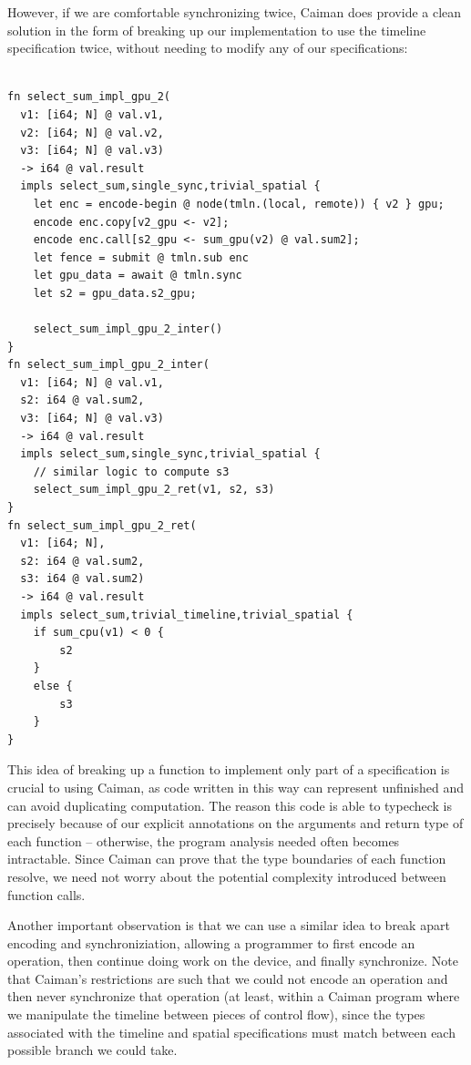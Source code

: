 However, if we are comfortable synchronizing twice, Caiman does provide a clean solution in the form of breaking up our implementation to use the timeline specification twice, without needing to modify any of our specifications:
%
\begin{lstlisting}

fn select_sum_impl_gpu_2(
  v1: [i64; N] @ val.v1,
  v2: [i64; N] @ val.v2,
  v3: [i64; N] @ val.v3) 
  -> i64 @ val.result
  impls select_sum,single_sync,trivial_spatial {
    let enc = encode-begin @ node(tmln.(local, remote)) { v2 } gpu;
    encode enc.copy[v2_gpu <- v2];
    encode enc.call[s2_gpu <- sum_gpu(v2) @ val.sum2];
    let fence = submit @ tmln.sub enc
    let gpu_data = await @ tmln.sync
    let s2 = gpu_data.s2_gpu;
    
    select_sum_impl_gpu_2_inter()
}
fn select_sum_impl_gpu_2_inter(
  v1: [i64; N] @ val.v1, 
  s2: i64 @ val.sum2, 
  v3: [i64; N] @ val.v3)
  -> i64 @ val.result
  impls select_sum,single_sync,trivial_spatial {
    // similar logic to compute s3
    select_sum_impl_gpu_2_ret(v1, s2, s3)
}
fn select_sum_impl_gpu_2_ret(
  v1: [i64; N], 
  s2: i64 @ val.sum2, 
  s3: i64 @ val.sum2) 
  -> i64 @ val.result
  impls select_sum,trivial_timeline,trivial_spatial {
    if sum_cpu(v1) < 0 {
        s2
    }
    else {
        s3
    }
}
\end{lstlisting}
%
This idea of breaking up a function to implement only part of a specification is crucial to using Caiman, as code written in this way can represent unfinished and can avoid duplicating computation.  The reason this code is able to typecheck is precisely because of our explicit annotations on the arguments and return type of each function -- otherwise, the program analysis needed often becomes intractable.  Since Caiman can prove that the type boundaries of each function resolve, we need not worry about the potential complexity introduced between function calls.

Another important observation is that we can use a similar idea to break apart encoding and synchroniziation, allowing a programmer to first encode an operation, then continue doing work on the device, and finally synchronize.  Note that Caiman's restrictions are such that we could not encode an operation and then never synchronize that operation (at least, within a Caiman program where we manipulate the timeline between pieces of control flow), since the types associated with the timeline and spatial specifications must match between each possible branch we could take.

